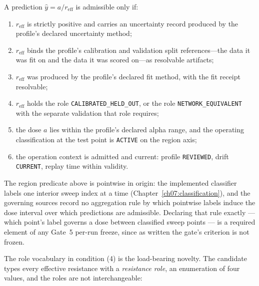 \begin{ruleenv}\label{ch06:rule:admissibility}
A prediction $\hat y = a/r_{\mathrm{eff}}$ is admissible only if:
\begin{enumerate}
\item $r_{\mathrm{eff}}$ is strictly positive and carries an uncertainty
record produced by the profile's declared uncertainty method;
\item $r_{\mathrm{eff}}$ binds the profile's calibration and validation
split references---the data it was fit on and the data it was scored
on---as resolvable artifacts;
\item $r_{\mathrm{eff}}$ was produced by the profile's declared fit method,
with the fit receipt resolvable;
\item $r_{\mathrm{eff}}$ holds the role \texttt{CALIBRATED\_HELD\_OUT}, or
the role \texttt{NETWORK\_EQUIVALENT} with the separate validation that
role requires;
\item the dose $a$ lies within the profile's declared alpha range, and the
operating classification at the test point is \texttt{ACTIVE} on the
region axis;
\item the operation context is admitted and current: profile
\texttt{REVIEWED}, drift \texttt{CURRENT}, replay time within validity.
\end{enumerate}
\end{ruleenv}

The region predicate above is pointwise in origin: the implemented
classifier labels one interior sweep index at a time
(Chapter~\ref{ch07:classification}), and the governing sources record no
aggregation rule by which pointwise labels induce the dose interval over
which predictions are admissible. Declaring that rule exactly --- which
point's label governs a dose between classified sweep points --- is a
required element of any Gate~5 per-run freeze, since as written the
gate's criterion is not frozen.

The role vocabulary in condition (4) is the load-bearing novelty. The
candidate types every effective resistance with a \emph{resistance role},
an enumeration of four values, and the roles are not interchangeable:

